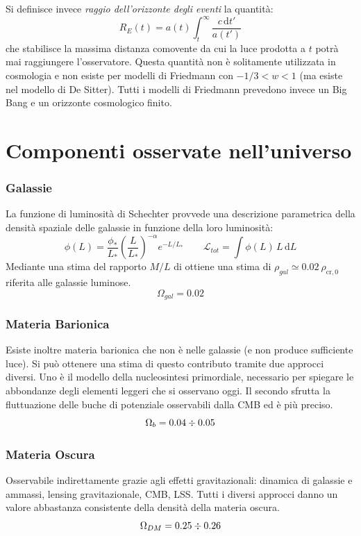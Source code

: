 Si definisce invece \textit{raggio dell'orizzonte degli eventi} la quantità:
\begin{equation}
     R_E (t) = a(t) \int_t^\infty \frac{c\, \mathrm{d}t'}{a(t')}
\end{equation}
che stabilisce la massima distanza comovente da cui la luce prodotta a $t$ potrà mai raggiungere l'osservatore. Questa quantità non è solitamente utilizzata in cosmologia e non esiste per modelli di Friedmann con $-1/3<w<1$ (ma esiste nel modello di De Sitter). Tutti i modelli di Friedmann prevedono invece un Big Bang e un orizzonte cosmologico finito. 

\section{Componenti osservate nell'universo}

\subsubsection{Galassie}
La funzione di luminosità di Schechter provvede una descrizione parametrica della densità spaziale delle galassie in funzione della loro luminosità:
$$
\phi (L) = \frac{\phi_*}{L_*} \left ( \frac{L}{L_*}  \right)^{-\alpha}e^{-L/L_*}\qquad \mathcal{L}_{tot}=\int \phi (L) \, L \, \mathrm{d}L
$$
Mediante una stima del rapporto $M/L$ di ottiene una stima di $\rho_{gal} \simeq 0.02\: \rho_{\mathrm{cr},0}$ riferita alle galassie luminose.
\begin{equation}
    \Omega_{gal}=0.02
\end{equation}

\subsubsection{Materia Barionica}
Esiste inoltre materia barionica che non è nelle galassie (e non produce sufficiente luce). Si può ottenere una stima di questo contributo tramite due approcci diversi. Uno è il modello della nucleosintesi primordiale, necessario per spiegare le abbondanze degli elementi leggeri che si osservano oggi. Il secondo sfrutta la fluttuazione delle buche di potenziale osservabili dalla CMB ed è più preciso.
\begin{equation}
    \Omega_{b}=0.04 \div 0.05
\end{equation}

\subsubsection{Materia Oscura}
Osservabile indirettamente grazie agli effetti gravitazionali: dinamica di galassie e ammassi, lensing gravitazionale, CMB, LSS. Tutti i diversi approcci danno un valore abbastanza consistente della densità della materia oscura.
\begin{equation}
    \Omega_{DM}=0.25 \div 0.26
\end{equation}

